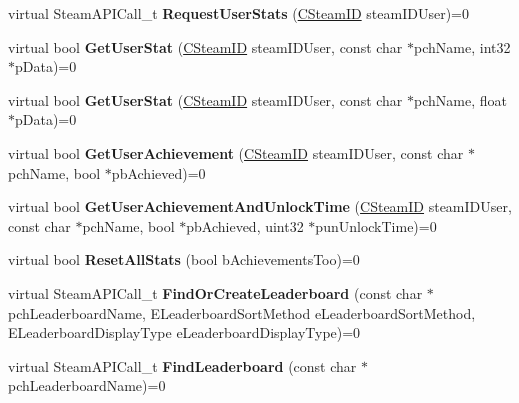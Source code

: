 \begin{DoxyCompactItemize}
virtual Steam\+A\+P\+I\+Call\+\_\+t {\bfseries Request\+User\+Stats} (\hyperlink{class_c_steam_i_d}{C\+Steam\+ID} steam\+I\+D\+User)=0
\item 
\mbox{\label{class_i_steam_user_stats_a586b19fc2da8208010944a8fa3a3bd52}} 
virtual bool {\bfseries Get\+User\+Stat} (\hyperlink{class_c_steam_i_d}{C\+Steam\+ID} steam\+I\+D\+User, const char $\ast$pch\+Name, int32 $\ast$p\+Data)=0
\item 
\mbox{\label{class_i_steam_user_stats_ae81412efaee9f896f58fab3a483bdc2e}} 
virtual bool {\bfseries Get\+User\+Stat} (\hyperlink{class_c_steam_i_d}{C\+Steam\+ID} steam\+I\+D\+User, const char $\ast$pch\+Name, float $\ast$p\+Data)=0
\item 
\mbox{\label{class_i_steam_user_stats_a2fd15de7d4cfa14d2146f63fda3b4f71}} 
virtual bool {\bfseries Get\+User\+Achievement} (\hyperlink{class_c_steam_i_d}{C\+Steam\+ID} steam\+I\+D\+User, const char $\ast$pch\+Name, bool $\ast$pb\+Achieved)=0
\item 
\mbox{\label{class_i_steam_user_stats_a7c178b581de8759ff1b82f039242c7b0}} 
virtual bool {\bfseries Get\+User\+Achievement\+And\+Unlock\+Time} (\hyperlink{class_c_steam_i_d}{C\+Steam\+ID} steam\+I\+D\+User, const char $\ast$pch\+Name, bool $\ast$pb\+Achieved, uint32 $\ast$pun\+Unlock\+Time)=0
\item 
\mbox{\label{class_i_steam_user_stats_a2268bc9272b59943cc78fbd50fa0eab0}} 
virtual bool {\bfseries Reset\+All\+Stats} (bool b\+Achievements\+Too)=0
\item 
\mbox{\label{class_i_steam_user_stats_a4e46e5be8fc1048238f56ffce67a60b2}} 
virtual Steam\+A\+P\+I\+Call\+\_\+t {\bfseries Find\+Or\+Create\+Leaderboard} (const char $\ast$pch\+Leaderboard\+Name, E\+Leaderboard\+Sort\+Method e\+Leaderboard\+Sort\+Method, E\+Leaderboard\+Display\+Type e\+Leaderboard\+Display\+Type)=0
\item 
\mbox{\label{class_i_steam_user_stats_acf30306ff9798e729cbdf8e092979ffe}} 
virtual Steam\+A\+P\+I\+Call\+\_\+t {\bfseries Find\+Leaderboard} (const char $\ast$pch\+Leaderboard\+Name)=0

\end{DoxyCompactItemize}
